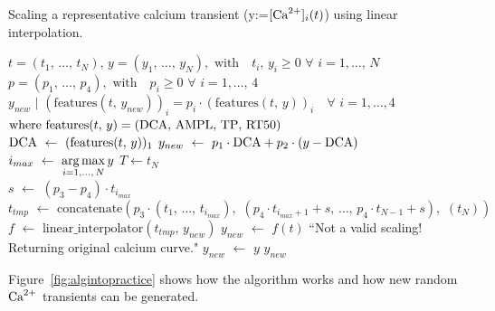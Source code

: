 \begin{algorithm}[ht!]
    \caption{Scaling a representative calcium transient (y:=$[\textrm{Ca}^{2+}]_{i}(t)$) using linear interpolation.}\label{alg:cascaling}
    \begin{algorithmic} 
    \REQUIRE $t=(t_1,\,\dots,\,t_N),\,y=(y_1,\,\dots,\,y_N),\,\,\textrm{with}\quad t_i,\,y_i\ge 0\,\,\forall\,\,i=1,\dots,\,N$ \\ $p=(p_1,\,\dots,\,p_4),\,\,\textrm{with}\quad p_i\ge 0\,\,\forall\,\,i=1,\dots,\,4$
    \ENSURE $y_{new}\,\,|\,\,(\textrm{features}(t,\,y_{new}))_{i} = p_i\cdot(\textrm{features}(t,\,y))_{i}\quad\forall\,\,i=1,\dots,4$ \\ $\textrm{where}\,\,\textrm{features}(t,\,y) = (\textrm{DCA},\,\textrm{AMPL},\,\textrm{TP},\,\textrm{RT50})$ \\ \vspace{0.2cm}
    \STATE $\textrm{DCA}\,\,\leftarrow\,\,(\textrm{features}(t,\,y))_1$
    \STATE $y_{new}\,\,\leftarrow\,\,p_1\cdot\textrm{DCA} + p_2\cdot(y-\textrm{DCA})$
    \STATE $i_{max}\,\,\leftarrow\,\,\operatorname*{arg\,max}\limits_{i=1,\dots,\,N}{y}$
    \STATE $T \leftarrow t_{N}$ \\
    \vspace{0.2cm}
    \STATE $s\,\,\leftarrow\,\,(p_3 - p_4)\cdot t_{i_{max}}$
    \STATE $t_{tmp}\,\,\leftarrow\,\,\textrm{concatenate}(p_3\cdot (t_{1},\,\dots,\,t_{i_{max}}),\,\,(p_4\cdot t_{i_{max}+1}+s,\,\dots,\,p_4\cdot t_{N-1}+s),\,\,(t_{N}))$
    \STATE $f\,\,\leftarrow\,\,\textrm{linear\_interpolator}(t_{tmp},\, y_{new})$
    \STATE $y_{new}\,\,\leftarrow\,\,f(t)$
    \ELSE
    \PRINT ``Not a valid scaling! Returning original calcium curve."
    \STATE $y_{new}\,\,\leftarrow\,\,y$
    \ENDIF
    \RETURN $y_{new}$
    \end{algorithmic}
    \label{alg:caalg}
\end{algorithm}

\vspace{0.2cm}
Figure~\ref{fig:algintopractice} shows how the algorithm works and how new random $\textrm{Ca}^{2+}$ transients can be generated.

